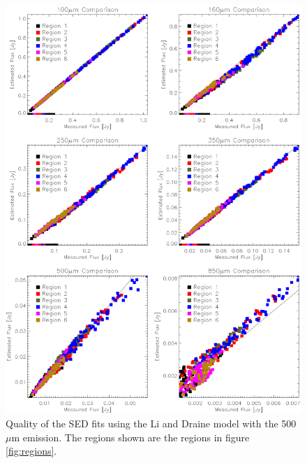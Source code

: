 \begin{figure}
  \centering
  \includegraphics[width=1.\textwidth]{sed_imgs/flux_compare_2_5.eps}
  \caption[Li and Draine Model SED Fit Quality Using 500$\mu$m Data]{Quality of the SED fits using the Li and Draine model with the 500$\mu$m emission.  The regions shown are the regions in figure \ref{fig:regions}.}
  \label{fig:w2_5}
\end{figure}

